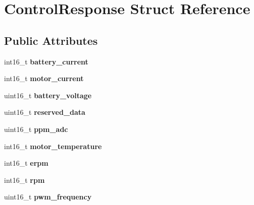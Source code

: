 \hypertarget{structControlResponse}{}\section{Control\+Response Struct Reference}
\label{structControlResponse}
\subsection*{Public Attributes}
\begin{DoxyCompactItemize}
\item 
\mbox{\label{structControlResponse_a186d016869eb2ce90a2436cfb4d04e8c}} 
int16\+\_\+t {\bfseries battery\+\_\+current}
\item 
\mbox{\label{structControlResponse_afa59d2c9e3d8dda3ebdcd7c5e17fa5f2}} 
int16\+\_\+t {\bfseries motor\+\_\+current}
\item 
\mbox{\label{structControlResponse_a3d47770ef278ec131d29a7409b46a4e2}} 
uint16\+\_\+t {\bfseries battery\+\_\+voltage}
\item 
\mbox{\label{structControlResponse_af6848f07b4e4ae2e6cd49d90983b229a}} 
uint16\+\_\+t {\bfseries reserved\+\_\+data}
\item 
\mbox{\label{structControlResponse_aebf2539ed484813d25e925a198c7849a}} 
uint16\+\_\+t {\bfseries ppm\+\_\+adc}
\item 
\mbox{\label{structControlResponse_a137abb16394ba1cda8bf7de163776311}} 
int16\+\_\+t {\bfseries motor\+\_\+temperature}
\item 
\mbox{\label{structControlResponse_a20ee2b4e5fd6a8328ce713c6d9b681e0}} 
int16\+\_\+t {\bfseries erpm}
\item 
\mbox{\label{structControlResponse_a6245c488d394e709d19e6d69fc9aece6}} 
int16\+\_\+t {\bfseries rpm}
\item 
\mbox{\label{structControlResponse_abcbc48206cf93810547848b6042b39f0}} 
uint16\+\_\+t {\bfseries pwm\+\_\+frequency}

\end{DoxyCompactItemize}
